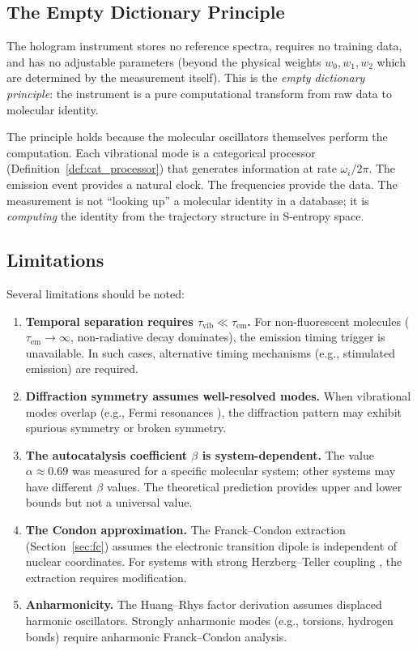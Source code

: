 \documentclass[11pt,a4paper]{article}
\theoremstyle{definition}
\theoremstyle{remark}
\begin{document}
\subsection{The Empty Dictionary Principle}

The hologram instrument stores no reference spectra, requires no training data, and has no adjustable parameters (beyond the physical weights $w_0, w_1, w_2$ which are determined by the measurement itself). This is the \emph{empty dictionary principle}: the instrument is a pure computational transform from raw data to molecular identity.

The principle holds because the molecular oscillators themselves perform the computation. Each vibrational mode is a categorical processor (Definition~\ref{def:cat_processor}) that generates information at rate $\omega_i / 2\pi$. The emission event provides a natural clock. The frequencies provide the data. The measurement is not ``looking up'' a molecular identity in a database; it is \emph{computing} the identity from the trajectory structure in S-entropy space.

\subsection{Limitations}

Several limitations should be noted:

\begin{enumerate}[label=(\roman*)]
  \item \textbf{Temporal separation requires $\tau_{\mathrm{vib}} \ll \tau_{\mathrm{em}}$.} For non-fluorescent molecules ($\tau_{\mathrm{em}} \to \infty$, non-radiative decay dominates), the emission timing trigger is unavailable. In such cases, alternative timing mechanisms (e.g., stimulated emission) are required.
  \item \textbf{Diffraction symmetry assumes well-resolved modes.} When vibrational modes overlap (e.g., Fermi resonances \citep{fermi1931}), the diffraction pattern may exhibit spurious symmetry or broken symmetry.
  \item \textbf{The autocatalysis coefficient $\beta$ is system-dependent.} The value $\alpha \approx 0.69$ was measured for a specific molecular system; other systems may have different $\beta$ values. The theoretical prediction provides upper and lower bounds but not a universal value.
  \item \textbf{The Condon approximation.} The Franck--Condon extraction (Section~\ref{sec:fc}) assumes the electronic transition dipole is independent of nuclear coordinates. For systems with strong Herzberg--Teller coupling \citep{duschinsky1937}, the extraction requires modification.
  \item \textbf{Anharmonicity.} The Huang--Rhys factor derivation assumes displaced harmonic oscillators. Strongly anharmonic modes (e.g., torsions, hydrogen bonds) require anharmonic Franck--Condon analysis.
\end{enumerate}
\end{document}
